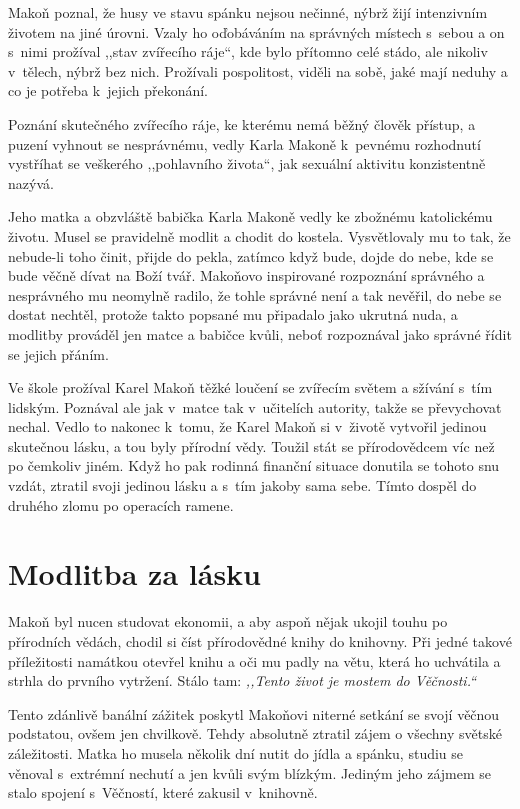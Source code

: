 Makoň poznal, že husy ve stavu spánku nejsou nečinné, nýbrž žijí intenzivním
životem na jiné úrovni. Vzaly ho oďobáváním na správných místech s~sebou a on
s~nimi prožíval ,,stav zvířecího ráje``, kde bylo přítomno celé stádo, ale
nikoliv v~tělech, nýbrž bez nich. Prožívali pospolitost, viděli na sobě, jaké
mají neduhy a co je potřeba k~jejich překonání.

Poznání skutečného zvířecího ráje, ke kterému nemá běžný člověk přístup, a
puzení vyhnout se nesprávnému, vedly Karla Makoně k~pevnému rozhodnutí vystříhat
se veškerého ,,pohlavního života``, jak sexuální aktivitu konzistentně nazývá.

Jeho matka a obzvláště babička Karla Makoně vedly ke zbožnému katolickému
životu. Musel se pravidelně modlit a chodit do kostela. Vysvětlovaly mu to tak,
že nebude-li toho činit, přijde do pekla, zatímco když bude, dojde do nebe, kde
se bude věčně dívat na Boží tvář. Makoňovo inspirované rozpoznání správného a
nesprávného mu neomylně radilo, že tohle správné není a tak nevěřil, do nebe se
dostat nechtěl, protože takto popsané mu připadalo jako ukrutná nuda, a modlitby
prováděl jen matce a babičce kvůli, neboť rozpoznával jako správné řídit se
jejich přáním.

Ve škole prožíval Karel Makoň těžké loučení se zvířecím světem a sžívání s~tím
lidským. Poznával ale jak v~matce tak v~učitelích autority, takže se převychovat
nechal. Vedlo to nakonec k~tomu, že Karel Makoň si v~životě vytvořil jedinou
skutečnou lásku, a tou byly přírodní vědy. Toužil stát se přírodovědcem víc než
po čemkoliv jiném. Když ho pak rodinná finanční situace donutila se tohoto snu
vzdát, ztratil svoji jedinou lásku a s~tím jakoby sama sebe.
Tímto dospěl do druhého zlomu po operacích ramene.

\section{Modlitba za lásku}

Makoň byl nucen studovat ekonomii, a aby aspoň nějak ukojil touhu po přírodních
vědách, chodil si číst přírodovědné knihy do knihovny. Při jedné takové
příležitosti namátkou otevřel knihu a oči mu padly na větu, která ho uchvátila a
strhla do prvního vytržení. Stálo tam: \textit{,,Tento život je mostem do
Věčnosti.``}

Tento zdánlivě banální zážitek poskytl Makoňovi niterné setkání se svojí věčnou
podstatou, ovšem jen chvilkově. Tehdy absolutně ztratil zájem o všechny světské
záležitosti. Matka ho musela několik dní nutit do jídla a spánku, studiu se
věnoval s~extrémní nechutí a jen kvůli svým blízkým. Jediným jeho zájmem se
stalo spojení s~Věčností, které zakusil v~knihovně.

